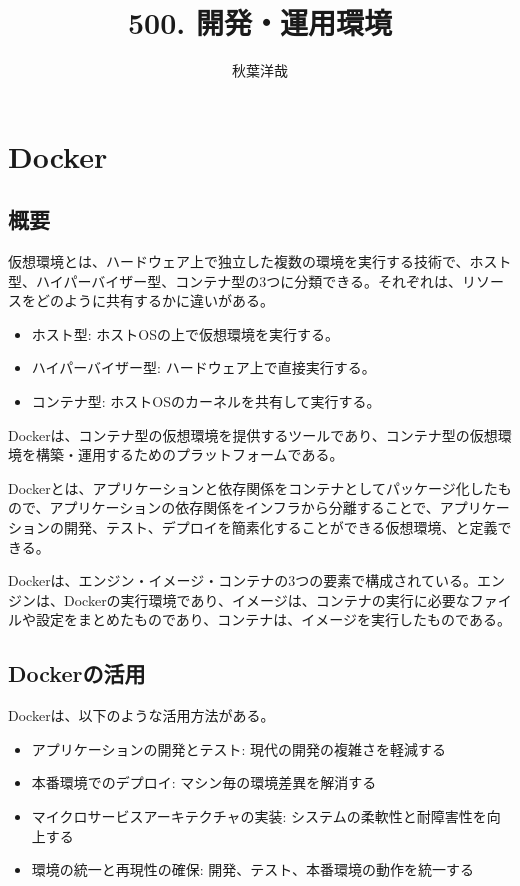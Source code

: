 \documentclass{ltjsarticle}
\begin{document}
\title{500. 開発・運用環境}
\author{秋葉洋哉}
\maketitle

\section{Docker}
\subsection{概要}
仮想環境とは、ハードウェア上で独立した複数の環境を実行する技術で、ホスト型、ハイパーバイザー型、コンテナ型の3つに分類できる。それぞれは、リソースをどのように共有するかに違いがある。
\begin{itemize}
  \item ホスト型: ホストOSの上で仮想環境を実行する。
  \item ハイパーバイザー型: ハードウェア上で直接実行する。
  \item コンテナ型: ホストOSのカーネルを共有して実行する。
\end{itemize}
Dockerは、コンテナ型の仮想環境を提供するツールであり、コンテナ型の仮想環境を構築・運用するためのプラットフォームである。
\par
Dockerとは、アプリケーションと依存関係をコンテナとしてパッケージ化したもので、アプリケーションの依存関係をインフラから分離することで、アプリケーションの開発、テスト、デプロイを簡素化することができる仮想環境、と定義できる。
\par
Dockerは、エンジン・イメージ・コンテナの3つの要素で構成されている。エンジンは、Dockerの実行環境であり、イメージは、コンテナの実行に必要なファイルや設定をまとめたものであり、コンテナは、イメージを実行したものである。

\subsection{Dockerの活用}
Dockerは、以下のような活用方法がある。
\begin{itemize}
  \item アプリケーションの開発とテスト: 現代の開発の複雑さを軽減する
  \item 本番環境でのデプロイ: マシン毎の環境差異を解消する
  \item マイクロサービスアーキテクチャの実装: システムの柔軟性と耐障害性を向上する
  \item 環境の統一と再現性の確保: 開発、テスト、本番環境の動作を統一する
\end{itemize}
\end{document}
